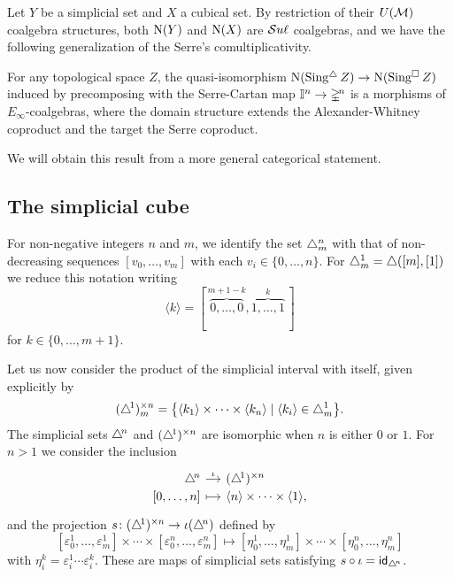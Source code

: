 Let $Y$ be a simplicial set and $X$ a cubical set.
By restriction of their $U(\mathcal{M})$ coalgebra structures, both $\operatorname{N}(Y)$ and $\operatorname{N}(X)$ are $\mathcal{S}u\ell$ coalgebras, and we have the following generalization of the Serre's comultiplicativity.

\begin{theorem} \label{t:extended comultiplicativity}
	For any topological space $Z$, the quasi-isomorphism $\operatorname{N}(\operatorname{Sing^{\triangle}} Z) \to \operatorname{N}(\operatorname{Sing^{\square}} Z)$ induced by precomposing with the Serre-Cartan map $\mathbb{I}^n \to \mathbb{\Delta}^{\!n}$ is a morphisms of $E_\infty$-coalgebras, where the domain structure extends the Alexander-Whitney coproduct and the target the Serre coproduct.
\end{theorem}

We will obtain this result from a more general categorical statement.

\subsection{The simplicial cube} \label{ss:the simplicial cube}

For non-negative integers $n$ and $m$, we identify the set $\triangle^n_m$ with that of non-decreasing sequences $[v_0, \dots, v_m]$ with each $v_i \in \{0, \dots, n\}$.
For $\triangle^1_m = \triangle([m], [1])$ we reduce this notation writing
\[
\langle k \rangle = [\, \overbrace{0, \dots, 0}^{m+1-k}, \overbrace{1, \dots, 1}^{k}\,]
\]
for $k \in \{0, \dots, m+1\}$.

Let us now consider the product of the simplicial interval with itself, given explicitly by
\[
(\triangle^{\!1})^{\times n}_m = \big\{ \langle k_1\rangle \times \cdots \times \langle k_n\rangle \mid \langle k_i\rangle \in \triangle^1_m \big\}.
\]
The simplicial sets $\triangle^{\!n}$ and $(\triangle^{\!1})^{\times n}$ are isomorphic when $n$ is either $0$ or $1$.
For $n > 1$ we consider the inclusion
\[
\begin{tikzcd}[row sep=-3pt, column sep=small,
/tikz/column 1/.append style={anchor=base east},
/tikz/column 2/.append style={anchor=base west}]
\simplex^{\!n} \arrow[r, "\iota"] & \scube{n} \\
{[0, \dots, n]} \arrow[r, mapsto] & \angles{n} \times \cdots \times \angles{1},
\end{tikzcd}
\]
and the projection $s \colon (\triangle^{\!1})^{\times n} \to \iota(\triangle^{\!n})$ defined by
\[
[ \varepsilon_0^1, \dots, \varepsilon_m^1] \times \cdots \times [ \varepsilon_0^n, \dots, \varepsilon_m^n] \mapsto [ \eta_0^1, \dots, \eta_m^1] \times \cdots \times [ \eta_0^n, \dots, \eta_m^n]
\]
with $\eta_i^k = \varepsilon_i^1 \cdots \varepsilon_i^k$.
These are maps of simplicial sets satisfying $s \circ \iota = \mathsf{id}_{\triangle^{\!n}}$.

